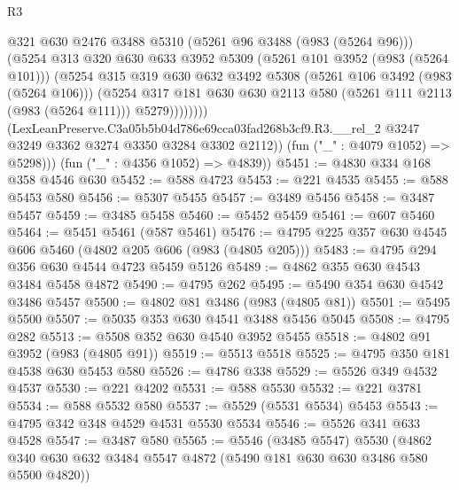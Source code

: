 \begin{lexlean}{R3}
\begin{coremodule}
                      @321
                      @630
                      @2476
                      @3488
                      @5310
                      (@5261 @96 @3488 (@983 (@5264 @96)))
                      (@5254
                        @313
                        @320
                        @630
                        @633
                        @3952
                        @5309
                        (@5261 @101 @3952 (@983 (@5264 @101)))
                        (@5254
                          @315
                          @319
                          @630
                          @632
                          @3492
                          @5308
                          (@5261 @106 @3492 (@983 (@5264 @106)))
                          (@5254
                            @317
                            @181
                            @630
                            @630
                            @2113
                            @580
                            (@5261 @111 @2113 (@983 (@5264 @111)))
                            @5279))))))))
            (LexLeanPreserve.C3a05b5b04d786e69cca03fad268b3cf9.R3.__rel_2
              @3247
              @3249
              @3362
              @3274
              @3350
              @3284
              @3302
              @2112))
          (fun ("_" : @4079 @1052) => @5298)))
      (fun ("_" : @4356 @1052) => @4839))
@5451 := @4830 @334 @168 @358 @4546 @630
@5452 := @588 @4723
@5453 := @221 @4535
@5455 := @588 @5453 @580
@5456 := @5307 @5455
@5457 := @3489 @5456
@5458 := @3487 @5457
@5459 := @3485 @5458
@5460 := @5452 @5459
@5461 := @607 @5460
@5464 := @5451 @5461 (@587 @5461)
@5476 := @4795 @225 @357 @630 @4545 @606 @5460 (@4802 @205 @606 (@983 (@4805 @205)))
@5483 := @4795 @294 @356 @630 @4544 @4723 @5459 @5126
@5489 := @4862 @355 @630 @4543 @3484 @5458 @4872
@5490 := @4795 @262
@5495 := @5490 @354 @630 @4542 @3486 @5457
@5500 := @4802 @81 @3486 (@983 (@4805 @81))
@5501 := @5495 @5500
@5507 := @5035 @353 @630 @4541 @3488 @5456 @5045
@5508 := @4795 @282
@5513 := @5508 @352 @630 @4540 @3952 @5455
@5518 := @4802 @91 @3952 (@983 (@4805 @91))
@5519 := @5513 @5518
@5525 := @4795 @350 @181 @4538 @630 @5453 @580
@5526 := @4786 @338
@5529 := @5526 @349 @4532 @4537
@5530 := @221 @4202
@5531 := @588 @5530
@5532 := @221 @3781
@5534 := @588 @5532 @580
@5537 := @5529 (@5531 @5534) @5453
@5543 := @4795 @342 @348 @4529 @4531 @5530 @5534
@5546 := @5526 @341 @633 @4528
@5547 := @3487 @580
@5565 := @5546
    (@3485 @5547)
    @5530
    (@4862 @340 @630 @632 @3484 @5547 @4872 (@5490 @181 @630 @630 @3486 @580 @5500 @4820))

\end{coremodule}
\end{lexlean}
